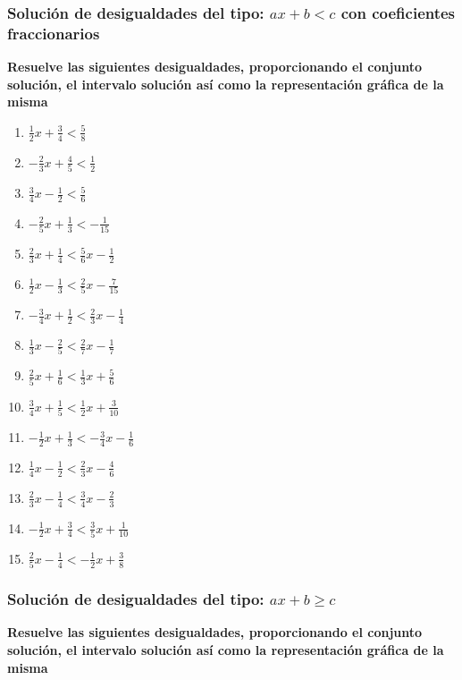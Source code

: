 \documentclass[12pt]{article}
\theoremstyle{plain}
\theoremstyle{definition}
\theoremstyle{remark}
\begin{document}
\subsubsection{Solución de desigualdades del tipo: \(ax+b<c\) con coeficientes fraccionarios}
\textbf{Resuelve las siguientes desigualdades, proporcionando el conjunto solución, el intervalo solución así como la representación gráfica de la misma}

\begin{enumerate}
\def\labelenumi{\arabic{enumi}.}
\item
  \(\frac{1}{2}x+\frac{3}{4}<\frac{5}{8}\)
\item
  \(-\frac{2}{3}x+\frac{4}{5}<\frac{1}{2}\)
\item
  \(\frac{3}{4}x-\frac{1}{2}<\frac{5}{6}\)
\item
  \(-\frac{2}{5}x+\frac{1}{3}<-\frac{1}{15}\)
\item
  \(\frac{2}{3}x+\frac{1}{4}<\frac{5}{6}x-\frac{1}{2}\)
\item
  \(\frac{1}{2}x-\frac{1}{3}<\frac{2}{5}x-\frac{7}{15}\)
\item
  \(-\frac{3}{4}x+\frac{1}{2}<\frac{2}{3}x-\frac{1}{4}\)
\item
  \(\frac{1}{3}x-\frac{2}{5}<\frac{2}{7}x-\frac{1}{7}\)
\item
  \(\frac{2}{5}x+\frac{1}{6}<\frac{1}{3}x+\frac{5}{6}\)
\item
  \(\frac{3}{4}x+\frac{1}{5}<\frac{1}{2}x+\frac{3}{10}\)
\item
  \(-\frac{1}{2}x+\frac{1}{3}<-\frac{3}{4}x-\frac{1}{6}\)
\item
  \(\frac{1}{4}x-\frac{1}{2}<\frac{2}{3}x-\frac{4}{6}\)
\item
  \(\frac{2}{3}x-\frac{1}{4}<\frac{3}{4}x-\frac{2}{3}\)
\item
  \(-\frac{1}{2}x+\frac{3}{4}<\frac{3}{5}x+\frac{1}{10}\)
\item
  \(\frac{2}{5}x-\frac{1}{4}<-\frac{1}{2}x+\frac{3}{8}\)
\end{enumerate}

\subsubsection{Solución de desigualdades del tipo: \(ax+b \geq c\)}

\textbf{Resuelve las siguientes desigualdades, proporcionando el conjunto solución, el intervalo solución así como la representación gráfica de la misma}
\end{document}
